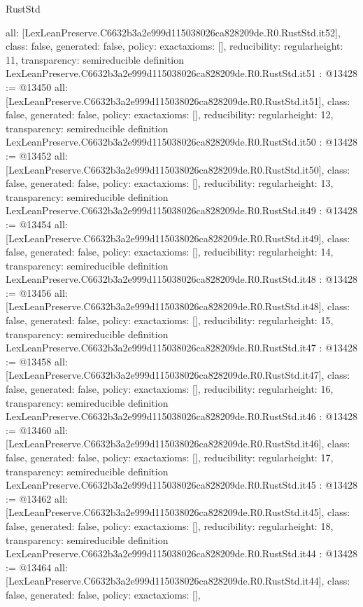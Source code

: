 \begin{lexlean}{RustStd}
\begin{coremodule}
{  all: [LexLeanPreserve.C6632b3a2e999d115038026ca828209de.R0.RustStd.it52],
  class: false,
  generated: false,
  policy: exact{axioms: []},
  reducibility: regular{height: 11},
  transparency: semireducible
}
definition LexLeanPreserve.C6632b3a2e999d115038026ca828209de.R0.RustStd.it51 : @13428 := @13450 {
  all: [LexLeanPreserve.C6632b3a2e999d115038026ca828209de.R0.RustStd.it51],
  class: false,
  generated: false,
  policy: exact{axioms: []},
  reducibility: regular{height: 12},
  transparency: semireducible
}
definition LexLeanPreserve.C6632b3a2e999d115038026ca828209de.R0.RustStd.it50 : @13428 := @13452 {
  all: [LexLeanPreserve.C6632b3a2e999d115038026ca828209de.R0.RustStd.it50],
  class: false,
  generated: false,
  policy: exact{axioms: []},
  reducibility: regular{height: 13},
  transparency: semireducible
}
definition LexLeanPreserve.C6632b3a2e999d115038026ca828209de.R0.RustStd.it49 : @13428 := @13454 {
  all: [LexLeanPreserve.C6632b3a2e999d115038026ca828209de.R0.RustStd.it49],
  class: false,
  generated: false,
  policy: exact{axioms: []},
  reducibility: regular{height: 14},
  transparency: semireducible
}
definition LexLeanPreserve.C6632b3a2e999d115038026ca828209de.R0.RustStd.it48 : @13428 := @13456 {
  all: [LexLeanPreserve.C6632b3a2e999d115038026ca828209de.R0.RustStd.it48],
  class: false,
  generated: false,
  policy: exact{axioms: []},
  reducibility: regular{height: 15},
  transparency: semireducible
}
definition LexLeanPreserve.C6632b3a2e999d115038026ca828209de.R0.RustStd.it47 : @13428 := @13458 {
  all: [LexLeanPreserve.C6632b3a2e999d115038026ca828209de.R0.RustStd.it47],
  class: false,
  generated: false,
  policy: exact{axioms: []},
  reducibility: regular{height: 16},
  transparency: semireducible
}
definition LexLeanPreserve.C6632b3a2e999d115038026ca828209de.R0.RustStd.it46 : @13428 := @13460 {
  all: [LexLeanPreserve.C6632b3a2e999d115038026ca828209de.R0.RustStd.it46],
  class: false,
  generated: false,
  policy: exact{axioms: []},
  reducibility: regular{height: 17},
  transparency: semireducible
}
definition LexLeanPreserve.C6632b3a2e999d115038026ca828209de.R0.RustStd.it45 : @13428 := @13462 {
  all: [LexLeanPreserve.C6632b3a2e999d115038026ca828209de.R0.RustStd.it45],
  class: false,
  generated: false,
  policy: exact{axioms: []},
  reducibility: regular{height: 18},
  transparency: semireducible
}
definition LexLeanPreserve.C6632b3a2e999d115038026ca828209de.R0.RustStd.it44 : @13428 := @13464 {
  all: [LexLeanPreserve.C6632b3a2e999d115038026ca828209de.R0.RustStd.it44],
  class: false,
  generated: false,
  policy: exact{axioms: []},
}
\end{coremodule}
\end{lexlean}
